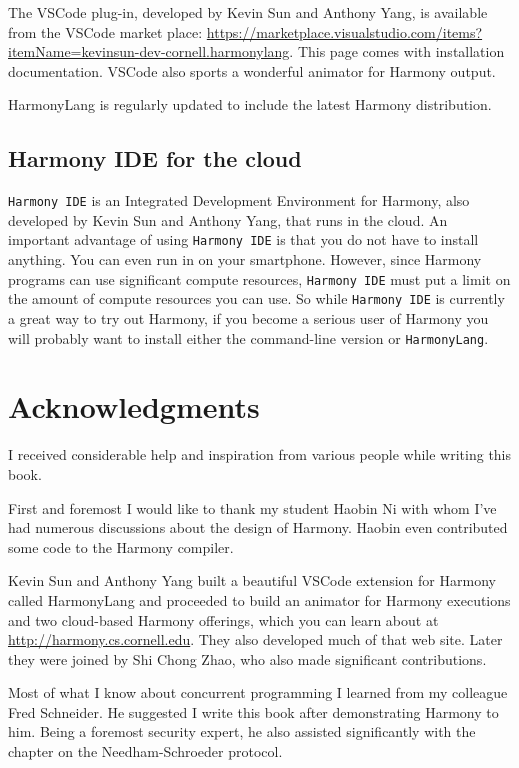\documentclass{report}
\begin{document}
The VSCode plug-in, developed by Kevin Sun and Anthony Yang,
is available from the VSCode market place: \url{https://marketplace.visualstudio.com/items?itemName=kevinsun-dev-cornell.harmonylang}.
This page comes with installation documentation.  VSCode also sports a
wonderful animator for Harmony output.

HarmonyLang is regularly updated to include the latest Harmony distribution.

\section{Harmony IDE for the cloud}

\texttt{Harmony IDE} is an Integrated Development Environment for Harmony,
also developed by Kevin Sun and Anthony Yang,
that runs in the cloud.  An important advantage of using \texttt{Harmony IDE}
is that you do not have to install anything.  You can even run in on your
smartphone.  However, since Harmony programs can use significant compute
resources, \texttt{Harmony IDE} must put a limit on the amount of compute
resources you can use.  So while \texttt{Harmony IDE} is currently a great
way to try out Harmony, if you become a serious user of Harmony you
will probably want to install either the command-line version or
\texttt{HarmonyLang}.

\cleardoublepage
{}
{}
\chapter*{Acknowledgments}

I received considerable help and inspiration from various people
while writing this book.

First and foremost I would like to thank my student Haobin Ni with
whom I've had numerous discussions about the design of Harmony.
Haobin even contributed some code to the Harmony compiler.

Kevin Sun and Anthony Yang built a beautiful VSCode extension for Harmony
called HarmonyLang and proceeded to build an animator for Harmony
executions and two cloud-based Harmony offerings, which you can learn
about at \url{http://harmony.cs.cornell.edu}.  They also developed much of
that web site.  Later they were joined by Shi Chong Zhao, who also
made significant contributions.

Most of what I know about concurrent programming I learned from
my colleague Fred Schneider.  He suggested I write this book after
demonstrating Harmony to him.  Being a foremost security expert, he also
assisted significantly with the chapter on the Needham-Schroeder protocol.
\end{document}
